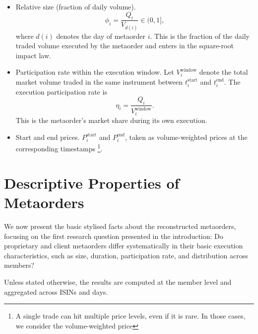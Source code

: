 \documentclass[11pt]{article}
\begin{document}
\begin{itemize}
  \item Relative size (fraction of daily volume).
        \begin{equation}
          \phi_i = \frac{Q_i}{V_{d(i)}} \in (0,1],
        \end{equation}
        where $d(i)$ denotes the day of metaorder $i$. This is the
        fraction of the daily traded volume executed by the metaorder and enters in the square-root impact law.

  \item Participation rate within the execution window. Let
        $V_i^{\text{window}}$ denote the total market volume
        traded in the same instrument between $t_i^{\text{start}}$ and
        $t_i^{\text{end}}$. The execution participation rate is
        \begin{equation}
          \eta_i = \frac{Q_i}{V_i^{\text{window}}}.
        \end{equation}
        This is the metaorder's market share during its own execution.

  \item Start and end prices. $P_i^{\text{start}}$ and
        $P_i^{\text{end}}$, taken as volume-weighted prices at the
        corresponding timestamps \footnote{A single trade can hit multiple price levels, even if it is rare. In those cases, we consider the volume-weighted price}.

\end{itemize}



\section{Descriptive Properties of Metaorders}
\label{sec:descriptive_properties}

We now present the basic stylised facts about the reconstructed metaorders, focusing on the first research question 
presented in the introduction: Do proprietary and client metaorders differ systematically in their basic execution 
characteristics, such as size, duration, participation rate, and distribution across members? 

Unless stated otherwise, the results are computed at the member 
level and aggregated across ISINs and days. 
\end{document}
